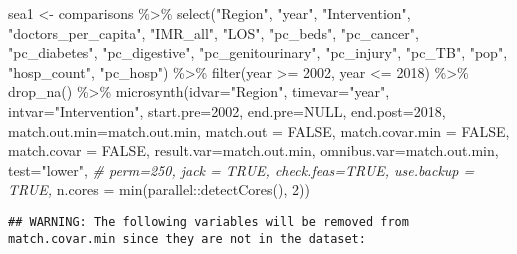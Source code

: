 \documentclass[
]{article}
\newenvironment{Shaded}{\begin{snugshade}}{\end{snugshade}}
\newcommand{\AttributeTok}[1]{\textcolor[rgb]{0.77,0.63,0.00}{#1}}
\newcommand{\CommentTok}[1]{\textcolor[rgb]{0.56,0.35,0.01}{\textit{#1}}}
\newcommand{\ConstantTok}[1]{\textcolor[rgb]{0.00,0.00,0.00}{#1}}
\newcommand{\DecValTok}[1]{\textcolor[rgb]{0.00,0.00,0.81}{#1}}
\newcommand{\FunctionTok}[1]{\textcolor[rgb]{0.00,0.00,0.00}{#1}}
\newcommand{\NormalTok}[1]{#1}
\newcommand{\OtherTok}[1]{\textcolor[rgb]{0.56,0.35,0.01}{#1}}
\newcommand{\SpecialCharTok}[1]{\textcolor[rgb]{0.00,0.00,0.00}{#1}}
\newcommand{\StringTok}[1]{\textcolor[rgb]{0.31,0.60,0.02}{#1}}
\begin{document}
\begin{Shaded}
\begin{Highlighting}[]
\NormalTok{sea1 }\OtherTok{\textless{}{-}}\NormalTok{ comparisons }\SpecialCharTok{\%\textgreater{}\%}
  \FunctionTok{select}\NormalTok{(}\StringTok{"Region"}\NormalTok{, }\StringTok{"year"}\NormalTok{, }\StringTok{"Intervention"}\NormalTok{, }\StringTok{"doctors\_per\_capita"}\NormalTok{, }\StringTok{"IMR\_all"}\NormalTok{, }
         \StringTok{"LOS"}\NormalTok{, }\StringTok{"pc\_beds"}\NormalTok{, }\StringTok{"pc\_cancer"}\NormalTok{, }\StringTok{"pc\_diabetes"}\NormalTok{, }\StringTok{"pc\_digestive"}\NormalTok{, }
         \StringTok{"pc\_genitourinary"}\NormalTok{, }\StringTok{"pc\_injury"}\NormalTok{, }\StringTok{"pc\_TB"}\NormalTok{, }\StringTok{"pop"}\NormalTok{, }\StringTok{"hosp\_count"}\NormalTok{, }
         \StringTok{"pc\_hosp"}\NormalTok{) }\SpecialCharTok{\%\textgreater{}\%}
  \FunctionTok{filter}\NormalTok{(year }\SpecialCharTok{\textgreater{}=} \DecValTok{2002}\NormalTok{, year }\SpecialCharTok{\textless{}=} \DecValTok{2018}\NormalTok{) }\SpecialCharTok{\%\textgreater{}\%}
  \FunctionTok{drop\_na}\NormalTok{() }\SpecialCharTok{\%\textgreater{}\%}
  \FunctionTok{microsynth}\NormalTok{(}\AttributeTok{idvar=}\StringTok{"Region"}\NormalTok{, }\AttributeTok{timevar=}\StringTok{"year"}\NormalTok{, }\AttributeTok{intvar=}\StringTok{"Intervention"}\NormalTok{,}
             \AttributeTok{start.pre=}\DecValTok{2002}\NormalTok{, }\AttributeTok{end.pre=}\ConstantTok{NULL}\NormalTok{, }\AttributeTok{end.post=}\DecValTok{2018}\NormalTok{,}
             \AttributeTok{match.out.min=}\NormalTok{match.out.min,}
             \AttributeTok{match.out =} \ConstantTok{FALSE}\NormalTok{,}
             \AttributeTok{match.covar.min =} \ConstantTok{FALSE}\NormalTok{,}
             \AttributeTok{match.covar =} \ConstantTok{FALSE}\NormalTok{,}
             \AttributeTok{result.var=}\NormalTok{match.out.min, }\AttributeTok{omnibus.var=}\NormalTok{match.out.min,}
             \AttributeTok{test=}\StringTok{"lower"}\NormalTok{,}
\CommentTok{\#             perm=250, jack = TRUE, check.feas=TRUE, use.backup = TRUE,}
             \AttributeTok{n.cores =} \FunctionTok{min}\NormalTok{(parallel}\SpecialCharTok{::}\FunctionTok{detectCores}\NormalTok{(), }\DecValTok{2}\NormalTok{))}
\end{Highlighting}
\end{Shaded}

\begin{verbatim}
## WARNING: The following variables will be removed from match.covar.min since they are not in the dataset:
\end{verbatim}
\end{document}
